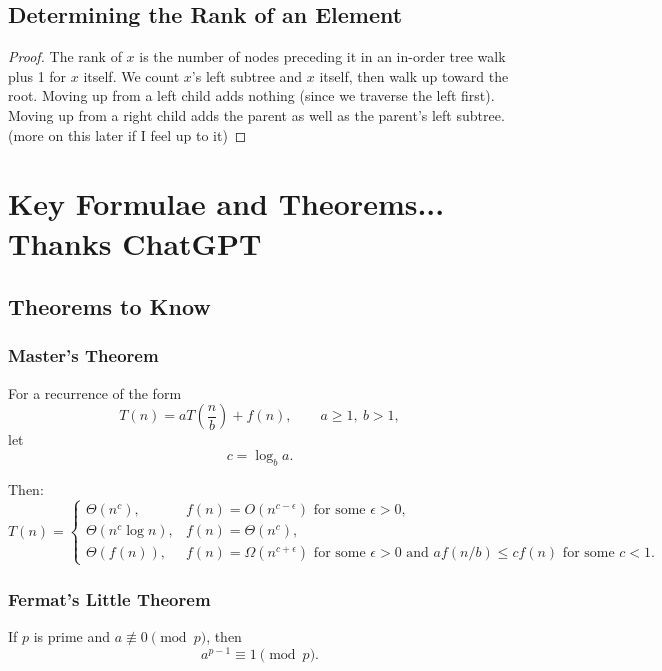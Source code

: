 \documentclass[11pt]{article}
\begin{document}
\subsection{Determining the Rank of an Element}
\begin{proof}
    The rank of $x$ is the number of nodes preceding it in an in-order tree walk plus 1 for $x$ 
    itself. We count $x$'s left subtree and $x$ itself, then walk up toward the root. Moving up from
    a left child adds nothing (since we traverse the left first). Moving up from a right child adds
    the parent as well as the parent's left subtree. (more on this later if I feel up to it)
\end{proof}








\newpage

\section{Key Formulae and Theorems... Thanks ChatGPT}

\subsection{Theorems to Know}

\subsubsection{Master's Theorem}
For a recurrence of the form
\[
T(n) = aT\left(\frac{n}{b}\right) + f(n),
\qquad a \geq 1,\ b > 1,
\]
let
\[
c = \log_b a.
\]

Then:
\[
T(n) =
\begin{cases}
\Theta(n^c), & f(n) = O(n^{c-\epsilon}) \text{ for some } \epsilon > 0, \\[4pt]
\Theta(n^c \log n), & f(n) = \Theta(n^c), \\[4pt]
\Theta(f(n)), & f(n) = \Omega(n^{c+\epsilon}) \text{ for some } \epsilon > 0
\text{ and } af(n/b) \leq cf(n) \text{ for some } c<1.
\end{cases}
\]

\subsubsection{Fermat's Little Theorem}

If $p$ is prime and $a\not\equiv 0\pmod p$, then
\[
a^{p-1}\equiv 1\pmod p.
\]
\end{document}
